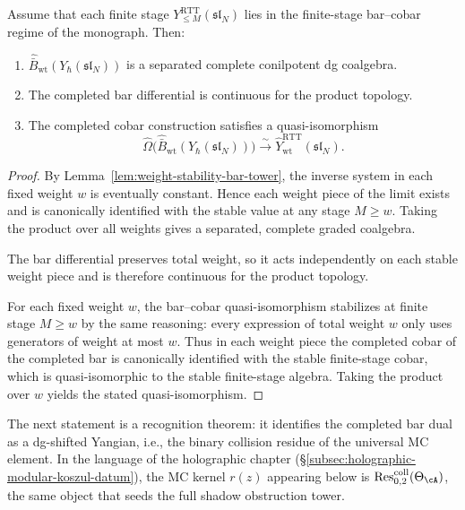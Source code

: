 \begin{theorem}
\ClaimStatusProvedHere
\label{thm:weightwise-MC4-principal-RTT}
Assume that each finite stage
$Y^{\mathrm{RTT}}_{\le M}(\mathfrak{sl}_N)$ lies in the finite-stage
bar--cobar regime of the monograph. Then:
\begin{enumerate}
 \item $\widehat{\bar B}_{\mathrm{wt}}(Y_\hbar(\mathfrak{sl}_N))$ is a
 separated complete conilpotent dg coalgebra.
 \item The completed bar differential is continuous for the product
 topology.
 \item The completed cobar construction satisfies a quasi-isomorphism
 \begin{equation}
 \widehat\Omega\Big(
 \widehat{\bar B}_{\mathrm{wt}}(Y_\hbar(\mathfrak{sl}_N))
 \Big)
 \xrightarrow{\sim}
 \widehat Y^{\mathrm{RTT}}_{\mathrm{wt}}(\mathfrak{sl}_N).
 \end{equation}
\end{enumerate}
\end{theorem}

\begin{proof}
By Lemma~\ref{lem:weight-stability-bar-tower}, the inverse system in each
fixed weight $w$ is eventually constant. Hence each weight piece of the
limit exists and is canonically identified with the stable value at any
stage $M\ge w$. Taking the product over all weights gives a separated,
complete graded coalgebra.

The bar differential preserves total weight, so it acts independently on
each stable weight piece and is therefore continuous for the product
topology.

For each fixed weight $w$, the bar--cobar quasi-isomorphism stabilizes at
finite stage $M\ge w$ by the same reasoning: every expression of total
weight $w$ only uses generators of weight at most $w$. Thus in each
weight piece the completed cobar of the completed bar is canonically
identified with the stable finite-stage cobar, which is quasi-isomorphic
to the stable finite-stage algebra. Taking the product over $w$ yields
the stated quasi-isomorphism.
\end{proof}

The next statement is a recognition theorem: it identifies the
completed bar dual as a dg-shifted Yangian, i.e., the binary collision
residue of the universal MC element. In the language of the holographic
chapter (\S\ref{subsec:holographic-modular-koszul-datum}), the
MC kernel $r(z)$ appearing below is
$\operatorname{Res}^{\mathrm{coll}}_{0,2}(\Theta_\cA)$, the same
object that seeds the full shadow obstruction tower.

